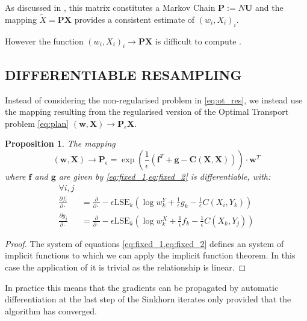 \documentclass[]{article}
\newtheorem{proposition}{Proposition}
\begin{document}
		As discussed in	\cite{reich2012nonparametric}, this matrix constitutes a Markov Chain $\mathbf{P} := N \mathbf{U}$ and the mapping $\tilde{X} = \mathbf{P} \mathbf{X}$ provides a consistent estimate of $(w_i, X_i)_i$.
		
		However the function $(w_i, X_i)_i \to \mathbf{P}\mathbf{X}$ is difficult to compute \parencite[see][]{cuturi2013sinkhorn}.
		
	\subsection{DIFFERENTIABLE RESAMPLING}
	\label{subsec:regOTResamp}
		Instead of considering the non-regularised problem in \cref{eq:ot_res}, we instead use the mapping resulting from the regularised version of the Optimal Transport problem \cref{eq:plan} \parencite{cuturi2013sinkhorn,feydy:interpolating} $(\mathbf{w}, \mathbf{X}) \to \mathbf{P}_\epsilon \mathbf{X}$.
		
		\begin{proposition}
			\label{prop:differentiability}
			The mapping $$(\mathbf{w}, \mathbf{X}) \to \mathbf{P}_\epsilon = \exp \left( \frac 1 \epsilon \left( \mathbf{f}^T + \mathbf{g} - \mathbf{C}(\mathbf{X},\mathbf{X}) \right)  \right) \cdot \mathbf{w}^T$$ where $\mathbf{f}$ and $\mathbf{g}$ are given by \cref{eq:fixed_1,eq:fixed_2} is differentiable, with:
			\begin{align}
				\forall i, j &\nonumber\\
				\frac{\partial f_i}{\partial \cdot} &= \frac{\partial}{\partial \cdot}-\epsilon \text{LSE}_k(\log w^Y_k + \frac 1 \epsilon g_k - \frac 1 \epsilon C(X_i, Y_k)) \label{eq:fixed_1_deriv}\\
				\frac{\partial g_j}{\partial \cdot} &= \frac{\partial}{\partial \cdot}-\epsilon \text{LSE}_k(\log w^X_k + \frac 1 \epsilon f_k - \frac 1 \epsilon C(X_k, Y_j)) \label{eq:fixed_2_deriv}
			\end{align}
		\end{proposition}
	
		\begin{proof}
			The system of equations \cref{eq:fixed_1,eq:fixed_2} defines an system of implicit functions to which we can apply the implicit function theorem. In this case the application of it is trivial as the relationship is linear.
		\end{proof}
	
		In practice this means that the gradients can be propagated by automatic differentiation at the last step of the Sinkhorn iterates only provided that the algorithm has converged. 
		
\end{document}
